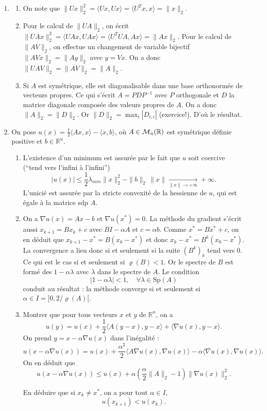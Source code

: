 \documentclass[11pt,a4paper]{article}
\begin{document}
\begin{enumerate}
\item  
\begin{enumerate}
 \item On note que $\|Ux\|_2^2=\langle Ux,Ux\rangle=\langle U^Tx,x\rangle=\|x\|_2$.
\item Pour le calcul de $\|UA\|_2$, on \'ecrit 
$\|UAx\|_2^2=\langle UAx,UAx\rangle=\langle U^TUA,Ax\rangle=\|Ax\|_2$. Pour le calcul de $\|AV\|_2$, on effectue un changement de variable bijectif
$\|AVx\|_2=\|Ay\|_2$ avec $y=Vx$. On a donc $\|UAV\|_2=\|AV\|_2=\|A\|_2$.
\item Si $A$ est sym\'etrique, elle est diagonalisable dans une base orthonorm\'ee de vecteurs propres. Ce qui s'écrit $A=PDP^{-1}$
avec $P$ orthogonale et $D$ la matrice diagonale 
compos\'ee des valeurs propres de $A$. On a donc
$\|A\|_2=\|D\|_2$. Or $\|D\|_2=\max_{i}|D_{i,i}|$ (exercice!). D'o\`u le r\'esultat. 
\end{enumerate}
\item 
On pose $u(x)=
\frac{1}{2} \langle A x,x \rangle - \langle x,b \rangle$,
o\`u $A\in{\cal M}_n({\mathbb R})$ est sym\'etrique d\'efinie positive et $b\in{\mathbb R}^n$. 

\begin{enumerate}
\item L'existence d'un minimum est assur\'ee par le fait que $u$ soit coercive (``tend vers l'infini \`a l'infini'')
\[|u(x)|\leq \frac12 \lambda_{min}\|x\|_2^2-\|b\|_2\,\|x\| \underset{\|x\|\to +\infty}{\to}+\infty.\]
L'unici\'e est assur\'ee par la stricte convexit\'e de la hessienne de $u$, qui est \'egale \`a la matrice sdp $A$. 
\item On a $\nabla u(x)=Ax-b$ et $\nabla u(x^\ast)=0$. La m\'ethode du gradient s'\'ecrit aussi $x_{k+1}=Bx_k +c$ avec $BI-\alpha A$ et $c=\alpha b$.  Comme $x^\ast=Bx^\ast +c$, on en d\'eduit que $x_{k+1}-x^\ast=B(x_k -x^\ast)$ et donc $x_{k}-x^\ast=B^k(x_0 -x^\ast)$. La convergence a lieu donc si et seulement si la suite $(B^k)_k$ tend vers $0$. Ce qui est le cas si et seulement si  $\varrho(B)<1$. Or le spectre de $B$ est form\'e des $1-\alpha\lambda$ avec $\lambda$ dans le spectre de $A$. Le condition 
\[|1-\alpha\lambda|< 1,\quad \forall \lambda \in\mbox{Sp}(A)\]
conduit au r\'esultat : la m\'ethode converge si et seulement si $\alpha \in I=]0, 2/\varrho(A)[$.
 \item Montrer que pour tous vecteurs $x$ et $y$ de ${\mathbb R}^n$, on a 
\[u(y) = u(x) + \frac{1}{2} 
\langle A (y-x),y-x \rangle +  \langle \nabla u(x), y-x \rangle.\] 
On prend $y=x-\alpha \nabla u(x)$ dans l'in\'egalit\'e :
\[u(x-\alpha \nabla u(x)) = u(x) + \frac{\alpha^2}{2} 
\langle A \nabla u(x),\nabla u(x) \rangle -\alpha \langle \nabla u(x), \nabla u(x) \rangle.\] 
On en d\'eduit  que 
\[u(x-\alpha \nabla u(x)) \leq u(x) + \alpha(\frac{\alpha}{2}\|A\|_2-1) \|\nabla u(x)\|_2^2.\]

En d\'eduire que si $x_k\neq x^\ast$, on a pour tout $\alpha \in I$,   
\[u(x_{k+1}) < u(x_k).\]

\end{enumerate} 
 
 
\end{enumerate}
\end{document}
